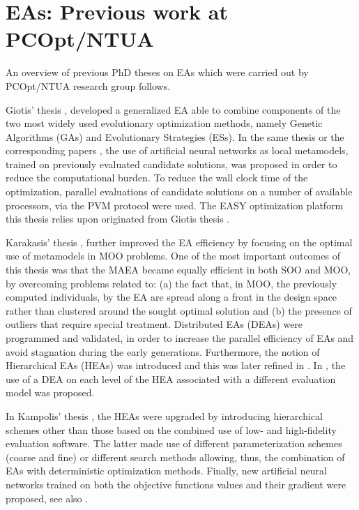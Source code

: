    

\section{EAs: Previous work at PCOpt/NTUA} %
\label{PRW}
An overview of previous PhD theses on EAs which were carried out by PCOpt/NTUA research group follows. 

Giotis' thesis \cite{phd_Giotis}, developed a generalized EA able to combine components of the two most widely used evolutionary optimization methods, namely Genetic Algorithms (GAs) and Evolutionary Strategies (ESs). In the same thesis or the corresponding papers \cite{kn:Emm2002,LTT_2_018,LTT_2_023}, the use of artificial neural networks as local metamodels, trained on previously evaluated candidate solutions, was proposed in order to reduce the computational burden. To reduce the wall clock time of the optimization, parallel evaluations of candidate solutions on a number of available processors, via the PVM protocol were used. The EASY optimization platform this thesis relies upon originated from Giotis thesis \cite{phd_Giotis}.   

Karakasis' thesis \cite{phd_Karakasis}, further improved the EA efficiency by focusing on the optimal use of metamodels in MOO problems. One of the most important outcomes of this thesis was that the MAEA became equally efficient in both SOO and MOO, by overcoming problems related to: (a) the fact that, in MOO, the previously computed individuals, by the EA are spread along a front in the design space rather than clustered around the sought optimal solution and (b) the presence of outliers that require special treatment. Distributed EAs (DEAs) were programmed and validated, in order to increase the parallel efficiency of EAs and avoid stagnation during the early generations. Furthermore, the notion of Hierarchical EAs (HEAs) was introduced and this  was later refined in \cite{phd_Kampolis}.    In \cite{phd_Karakasis}, the use of a DEA on each level of the HEA associated with a different evaluation model was proposed.

In Kampolis' thesis \cite{phd_Kampolis}, the HEAs were upgraded by introducing hierarchical schemes other than those based on the combined use of low- and high-fidelity evaluation software. The latter made use of different parameterization schemes (coarse and fine) or different search methods allowing, thus, the combination of EAs with deterministic optimization methods. Finally, new artificial neural networks trained on both the objective functions values and their gradient were proposed, see also \cite{LTT_2_026}.          

